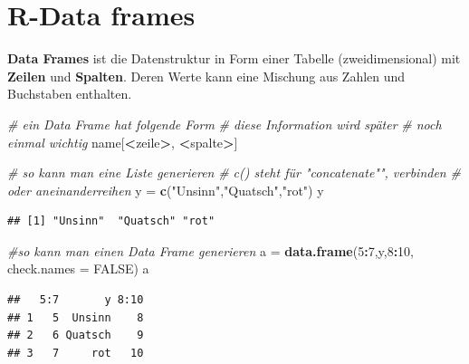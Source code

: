 \documentclass[]{book}
\newenvironment{Shaded}{\begin{snugshade}}{\end{snugshade}}
\newcommand{\KeywordTok}[1]{\textcolor[rgb]{0.13,0.29,0.53}{\textbf{#1}}}
\newcommand{\DataTypeTok}[1]{\textcolor[rgb]{0.13,0.29,0.53}{#1}}
\newcommand{\DecValTok}[1]{\textcolor[rgb]{0.00,0.00,0.81}{#1}}
\newcommand{\StringTok}[1]{\textcolor[rgb]{0.31,0.60,0.02}{#1}}
\newcommand{\CommentTok}[1]{\textcolor[rgb]{0.56,0.35,0.01}{\textit{#1}}}
\newcommand{\OtherTok}[1]{\textcolor[rgb]{0.56,0.35,0.01}{#1}}
\newcommand{\OperatorTok}[1]{\textcolor[rgb]{0.81,0.36,0.00}{\textbf{#1}}}
\newcommand{\NormalTok}[1]{#1}
\begin{document}
\section{R-Data frames}\label{r-data-frames}

\textbf{Data Frames} ist die Datenstruktur in Form einer Tabelle
(zweidimensional) mit \textbf{Zeilen} und \textbf{Spalten}. Deren Werte
kann eine Mischung aus Zahlen und Buchstaben enthalten.

\begin{Shaded}
\begin{Highlighting}[]
\CommentTok{# ein Data Frame hat folgende Form}
\CommentTok{# diese Information wird später}
\CommentTok{# noch einmal wichtig}
\NormalTok{name[}\OperatorTok{<}\NormalTok{zeile}\OperatorTok{>}\NormalTok{, }\OperatorTok{<}\NormalTok{spalte}\OperatorTok{>}\NormalTok{]}
\end{Highlighting}
\end{Shaded}

\begin{Shaded}
\begin{Highlighting}[]
\CommentTok{# so kann man eine Liste generieren}
\CommentTok{# c() steht für "concatenate"", verbinden }
\CommentTok{# oder aneinanderreihen }
\NormalTok{y =}\StringTok{ }\KeywordTok{c}\NormalTok{(}\StringTok{"Unsinn"}\NormalTok{,}\StringTok{"Quatsch"}\NormalTok{,}\StringTok{"rot"}\NormalTok{)}
\NormalTok{y}
\end{Highlighting}
\end{Shaded}

\begin{verbatim}
## [1] "Unsinn"  "Quatsch" "rot"
\end{verbatim}

\begin{Shaded}
\begin{Highlighting}[]
\CommentTok{#so kann man einen Data Frame generieren }
\NormalTok{a =}\StringTok{ }\KeywordTok{data.frame}\NormalTok{(}\DecValTok{5}\OperatorTok{:}\DecValTok{7}\NormalTok{,y,}\DecValTok{8}\OperatorTok{:}\DecValTok{10}\NormalTok{, }\DataTypeTok{check.names =} \OtherTok{FALSE}\NormalTok{)}
\NormalTok{a}
\end{Highlighting}
\end{Shaded}

\begin{verbatim}
##   5:7       y 8:10
## 1   5  Unsinn    8
## 2   6 Quatsch    9
## 3   7     rot   10
\end{verbatim}
\end{document}
